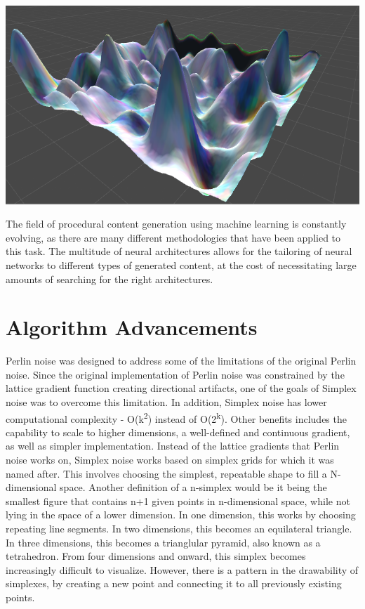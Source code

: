 \documentclass[10pt]{report}
\begin{document}
		\begin{minipage}{\textwidth}
			\centering
			\includegraphics[scale=.3]{rolling}
			\label{fig:fig8}
		\end{minipage}
	
		The field of procedural content generation using machine learning is constantly evolving, as there are many different methodologies that have been applied to this task. The multitude of neural architectures allows for the tailoring of neural networks to different types of generated content, at the cost of necessitating large amounts of searching for the right architectures.
		
		\cite{Liu_2020}
		
		\section{Algorithm Advancements}
		
		Perlin noise was designed to address some of the limitations of the original Perlin noise. Since the original implementation of Perlin noise was constrained by the lattice gradient function creating directional artifacts, one of the goals of Simplex noise was to overcome this limitation. In addition, Simplex noise has lower computational complexity - O(k\textsuperscript{2}) instead of O(2\textsuperscript{k})\cite{sheet-simplex}. Other benefits includes the capability to scale to higher dimensions, a well-defined and continuous gradient, as well as simpler implementation. Instead of the lattice gradients that Perlin noise works on, Simplex noise works based on simplex grids for which it was named after. This involves choosing the simplest, repeatable shape to fill a N-dimensional space. Another definition of a n-simplex would be it being the smallest figure that contains n+1 given points in n-dimensional space, while not lying in the space of a lower dimension. In one dimension, this works by choosing repeating line segments. In two dimensions, this becomes an equilateral triangle. In three dimensions, this becomes a trianglular pyramid, also known as a tetrahedron. From four dimensions and onward, this simplex becomes increasingly difficult to visualize. However, there is a pattern in the drawability of simplexes, by creating a new point and connecting it to all previously existing points.
		
\end{document}
